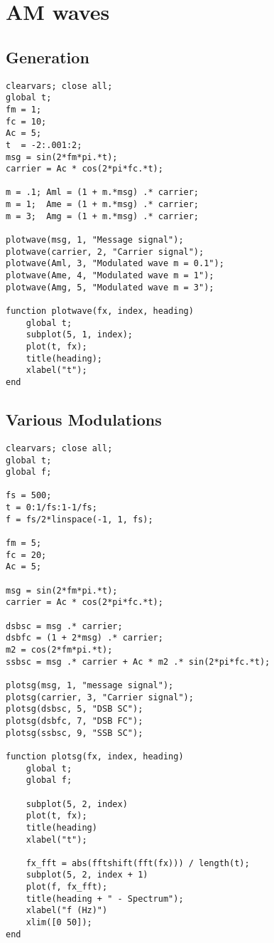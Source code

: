 \documentclass[12pt,a4paper]{article}
\newcommand{\sectiona}[1]{\pagebreak \section{\centering #1}}
\begin{document}
\sectiona{AM waves}
\subsection{Generation}
\begin{verbatim}
clearvars; close all;
global t;
fm = 1;
fc = 10;
Ac = 5;
t  = -2:.001:2;
msg = sin(2*fm*pi.*t);
carrier = Ac * cos(2*pi*fc.*t);

m = .1; Aml = (1 + m.*msg) .* carrier;
m = 1;  Ame = (1 + m.*msg) .* carrier;
m = 3;  Amg = (1 + m.*msg) .* carrier;

plotwave(msg, 1, "Message signal");
plotwave(carrier, 2, "Carrier signal");
plotwave(Aml, 3, "Modulated wave m = 0.1");
plotwave(Ame, 4, "Modulated wave m = 1");
plotwave(Amg, 5, "Modulated wave m = 3");

function plotwave(fx, index, heading)
    global t;
    subplot(5, 1, index);
    plot(t, fx);
    title(heading);
    xlabel("t");
end
\end{verbatim}

\subsection{Various Modulations}
\begin{verbatim}
clearvars; close all;
global t;
global f;

fs = 500;
t = 0:1/fs:1-1/fs;
f = fs/2*linspace(-1, 1, fs);

fm = 5;
fc = 20;
Ac = 5;

msg = sin(2*fm*pi.*t);
carrier = Ac * cos(2*pi*fc.*t);

dsbsc = msg .* carrier;
dsbfc = (1 + 2*msg) .* carrier;
m2 = cos(2*fm*pi.*t);
ssbsc = msg .* carrier + Ac * m2 .* sin(2*pi*fc.*t);

plotsg(msg, 1, "message signal");
plotsg(carrier, 3, "Carrier signal");
plotsg(dsbsc, 5, "DSB SC");
plotsg(dsbfc, 7, "DSB FC");
plotsg(ssbsc, 9, "SSB SC");

function plotsg(fx, index, heading)
    global t;
    global f;

    subplot(5, 2, index)
    plot(t, fx);
    title(heading)
    xlabel("t");

    fx_fft = abs(fftshift(fft(fx))) / length(t);
    subplot(5, 2, index + 1)
    plot(f, fx_fft);
    title(heading + " - Spectrum");
    xlabel("f (Hz)")
    xlim([0 50]);
end
\end{verbatim}
\end{document}
